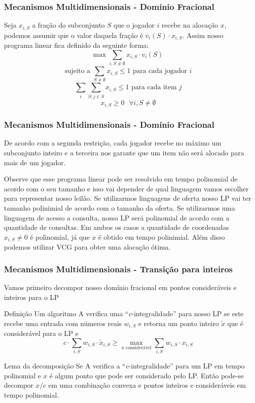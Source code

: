 \documentclass{beamer}
\begin{document}
\begin{frame}
    \frametitle{Mecanismos Multidimensionais - Domínio Fracional}
    Seja $x_{i, S}$ a fração do subconjunto $S$ que o jogador $i$ recebe na alocação $x$, podemos assumir que o valor daquela fração é $v_i(S) \cdot x_{i, S}$. Assim nosso programa linear fica definido da seguinte forma:
    $$
        \textrm{max } \sum_{i, S \neq \emptyset} x_{i, S} \cdot v_i(S)
    $$$$
        \textrm{sujeito a } \sum_{S \neq \emptyset} x_{i, S} \leq 1 \textrm{ para cada jogador } i
    $$$$
        \sum_i \sum_{S: j \in S} x_{i, S} \leq 1 \textrm{ para cada item } j
    $$$$
        x_{i, S} \geq 0 \textrm{    } \forall i, S \neq \emptyset
    $$
\end{frame}

\begin{frame}
    \frametitle{Mecanismos Multidimensionais - Domínio Fracional}
    De acordo com a segunda restrição, cada jogador recebe no máximo um subconjunto inteiro e a terceira nos garante que um item não será alocado para mais de um jogador.

    Observe que esse programa linear pode ser resolvido em tempo polinomial de acordo com o seu tamanho e isso vai depender de qual linguagem vamos escolher para representar nosso leilão. Se utilizarmos linguagens de oferta nosso LP vai ter tamanho polinimial de acordo com o tamanho da oferta. Se utilizarmos uma linguagem de acesso a consulta, nosso LP será polinomial de acordo com a quantidade de consultas. Em ambos os casos a quantidade de coordenadas $x_{i, S} \neq 0$ é polinomial, já que $x$ é obtido em tempo polinimial. Além disso podemos utilizar VCG para obter uma alocação ótima.
\end{frame}

\begin{frame}
    \frametitle{Mecanismos Multidimensionais - Transição para inteiros}
    Vamos primeiro decompor nosso domínio fracional em pontos consideráveis e inteiros para o LP
    \begin{block}{Definição}
        Um algoritmo A verifica uma ``\textit{c}-integralidade'' para nosso LP se este recebe uma entrada com números reais $w_{i, S}$ e retorna um ponto inteiro $\tilde{x}$ que é considerável para o LP e 
        $$
            c \cdot \sum_{i, S} w_{i, S} \cdot \tilde{x}_{i, S} \geq \max_{\textrm{x considerável}} \sum_{i, S} w_{i, S} \cdot x_{i, S}
        $$
    \end{block}
    \begin{block}{Lema da decomposição}
        Se A verifica a ``\textit{c}-integralidade'' para um LP em tempo polinomial e $x$ é algum ponto que pode ser considerado pelo LP. Então pode-se decompor $x/c$ em uma combinação convexa e pontos inteiros e consideráveis em tempo polinomial.
    \end{block}
\end{frame}
\end{document}
